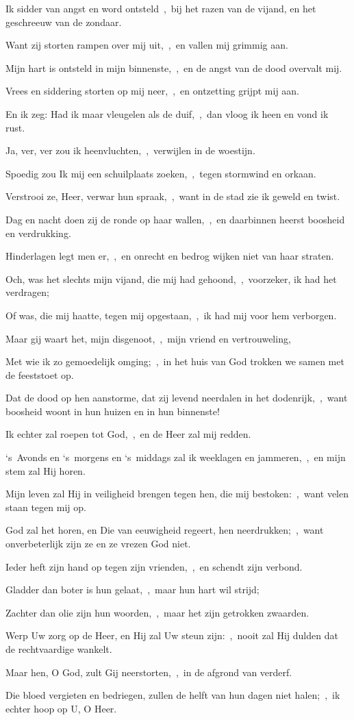 \documentclass[12pt,twoside,a5paper]{article}
\begin{document}
\begin{halfparskip}
  Ik sidder van angst en word ontsteld~\sep\ bij het razen van de vijand, en het geschreeuw van de zondaar.

  Want zij storten rampen over mij uit,~\sep\ en vallen mij grimmig aan.

  Mijn hart is ontsteld in mijn binnenste,~\sep\ en de angst van de dood overvalt mij.

  Vrees en siddering storten op mij neer,~\sep\ en ontzetting grijpt mij aan.

  En ik zeg: Had ik maar vleugelen als de duif,~\sep\ dan vloog ik heen en vond ik rust.

  Ja, ver, ver zou ik heenvluchten,~\sep\ verwijlen in de woestijn.

  Spoedig zou Ik mij een schuilplaats zoeken,~\sep\ tegen stormwind en orkaan.

  Verstrooi ze, Heer, verwar hun spraak,~\sep\ want in de stad zie ik geweld en twist.

  Dag en nacht doen zij de ronde op haar wallen,~\sep\ en daarbinnen heerst boosheid en verdrukking.

  Hinderlagen legt men er,~\sep\ en onrecht en bedrog wijken niet van haar straten.

  Och, was het slechts mijn vijand, die mij had gehoond,~\sep\ voorzeker, ik had het verdragen;

  Of was, die mij haatte, tegen mij opgestaan,~\sep\ ik had mij voor hem verborgen.

  Maar gij waart het, mijn disgenoot,~\sep\ mijn vriend en vertrouweling,

  Met wie ik zo gemoedelijk omging;~\sep\ in het huis van God trokken we samen met de feeststoet op.

  Dat de dood op hen aanstorme, dat zij levend neerdalen in het dodenrijk,~\sep\ want boosheid woont in hun huizen en in hun binnenste!

  Ik echter zal roepen tot God,~\sep\ en de Heer zal mij redden.

  `s~Avonds en `s~morgens en `s~middags zal ik weeklagen en jammeren,~\sep\ en mijn stem zal Hij horen.

  Mijn leven zal Hij in veiligheid brengen tegen hen, die mij bestoken:~\sep\ want velen staan tegen mij op.

  God zal het horen, en Die van eeuwigheid regeert, hen neerdrukken;~\sep\ want onverbeterlijk zijn ze en ze vrezen God niet.

  Ieder heft zijn hand op tegen zijn vrienden,~\sep\ en schendt zijn verbond.

  Gladder dan boter is hun gelaat,~\sep\ maar hun hart wil strijd;

  Zachter dan olie zijn hun woorden,~\sep\ maar het zijn getrokken zwaarden.

  Werp Uw zorg op de Heer, en Hij zal Uw steun zijn:~\sep\ nooit zal Hij dulden dat de rechtvaardige wankelt.

  Maar hen, O God, zult Gij neerstorten,~\sep\ in de afgrond van verderf.

  Die bloed vergieten en bedriegen, zullen de helft van hun dagen niet halen;~\sep\ ik echter hoop op U, O Heer.
\end{halfparskip}
\end{document}
